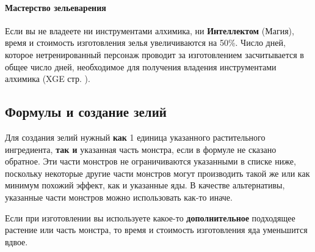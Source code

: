 \documentclass[a4paper, 9pt, twocolumn]{book}
\begin{document}
	\paragraph{Мастерство зельеварения}
	
	Если вы не владеете ни инструментами алхимика, ни \textbf{Интеллектом} (Магия), время и стоимость изготовления зелья увеличиваются на 50\%. Число дней, которое нетренированный персонаж проводит за изготовлением засчитывается в общее число дней, необходимое для получения владения инструментами алхимика (XGE стр. ). %
	
	\subsection{Формулы и создание зелий}
	
	Для создания зелий нужный \textbf{как} 1 единица указанного растительного ингредиента, \textbf{так и} указанная часть монстра, если в формуле не сказано обратное. Эти части монстров не ограничиваются указанными в списке ниже, поскольку некоторые другие части монстров могут производить такой же или как минимум похожий эффект, как и указанные яды. В качестве альтернативы, указанные части монстров можно использовать как-то иначе.
	
	Если при изготовлении вы используете какое-то \textbf{дополнительное} подходящее растение или часть монстра, то время и стоимость  изготовления яда уменьшится вдвое. 
	
\end{document}
